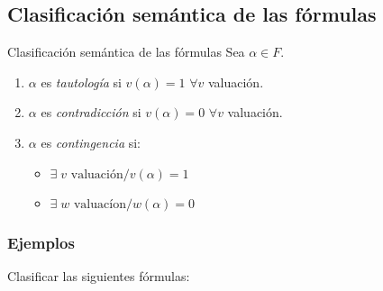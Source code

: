 \subsection{Clasificación semántica de las fórmulas}

\begin{definicion}{Clasificación semántica de las fórmulas}{}
    Sea $\alpha \in F.$

    \begin{enumerate}
        \item $\alpha$ es \textit{tautología} si $v(\alpha)=1$
            $\forall v$ valuación.
        \item $\alpha$ es \textit{contradicción} si $v(\alpha)=0$
            $\forall v$ valuación.
        \item $\alpha$ es \textit{contingencia} si:
            \begin{itemize}
                \item $\exists \; v \text{ valuación}/ v(\alpha) = 1$
                \item $\exists \; w \text{ valuacíon}/ w(\alpha)=0$
            \end{itemize}
    \end{enumerate}
\end{definicion}

\subsubsection{Ejemplos}

Clasificar las siguientes fórmulas:

